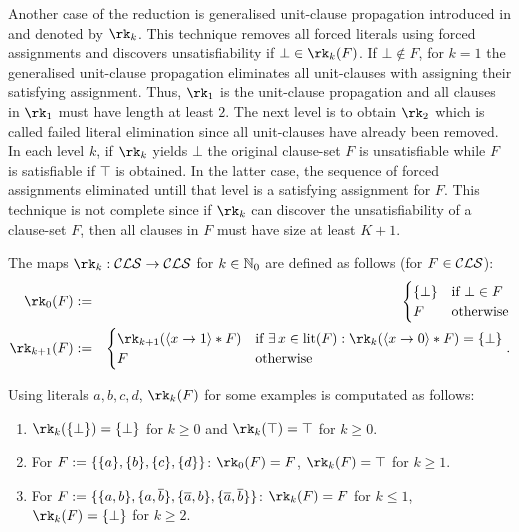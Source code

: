 \documentclass[]{book}
\begin{document}
Another case of the reduction is generalised unit-clause propagation introduced in \cite{h10} and denoted by $\rk_k$. This technique removes all forced literals using forced assignments and discovers unsatisfiability if $\bot \in \rk_k(F)$. If $\bot \not \in F$, for $k=1$ the generalised unit-clause propagation eliminates all unit-clauses with assigning their satisfying assignment. Thus, $\rk_1$ is the unit-clause propagation and all clauses in $\rk_1$ must have length at least $2$. The next level is to obtain $\rk_2$ which is called failed literal elimination since all unit-clauses have already been removed. In each level $k$, if $\rk_k$ yields $\bot$ the original clause-set $F$ is unsatisfiable while $F$ is satisfiable if $\top$ is obtained. In the latter case, the sequence of forced assignments eliminated untill that level is a satisfying assignment for $F$. This technique is not complete since if $\rk_k$ can discover the unsatisfiability of a clause-set $F$, then all clauses in $F$ must have size at least $K+1$.

\begin{defi}\label{def:rk}
\cite{h10} The maps $\rk_k: \Cls \ra \Cls$ for $k \in \mathbb{N}_0$ are defined as follows (for $F \in \mathcal{CLS}$):
  \begin{eqnarray*}
  \rk_0(F) & := &
  \begin{cases}
  \set{\bot} & \text{if } \bot \in F\\ F & \text{otherwise}
  \end{cases}\\
  \rk_{k+1}(F) & := &
  \begin{cases}
  \rk_{k+1}(\pao x1 * F) & \text{if } \ex\, x \in \lit(F) : \rk_k(\pao x0 * F) = \set{\bot}\\ F & \text{otherwise}
  \end{cases}.
  \end{eqnarray*}
\end{defi}

\begin{examp}\label{exp:rk}
Using literals $a,b,c,d$, $\rk_k(F)$ for some examples is computated as follows:
  \begin{enumerate}
  \item $\rk_k(\set{\bot}) = \set{\bot}$ for $k \ge 0$ and $\rk_k(\top) = \top$ for $k \ge 0$.
  \item For $F := \{ \{ a \},\{ b \},\{ c \},\{ d \} \}$: $\rk_0(F) = F$, $\rk_k(F) = \top$ for $k \ge 1$.
  \item For $F := \{ \{ a,b \},\{ a,\overline{b} \}, \{ \overline{a},b \},\{ \overline{a},\overline{b} \} \}$: $\rk_k(F) = F$ for $k \le 1$, $\rk_k(F) = \set{\bot}$ for $k \ge 2$.
  \end{enumerate}
\end{examp}
\end{document}
